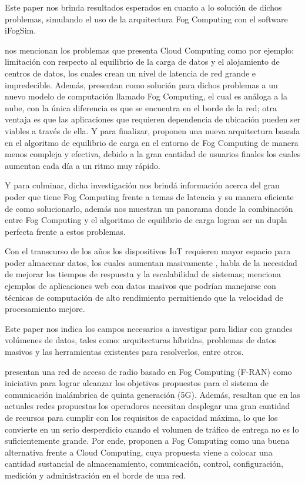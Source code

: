        Este paper nos brinda resultados esperados en cuanto a lo solución de dichos problemas, simulando el uso de la arquitectura Fog Computing con el software iFogSim.\par
        \vskip 0.3cm
        {\bf\cite{verma2015}} nos mencionan los problemas que presenta Cloud Computing como por ejemplo: limitación con respecto al equilibrio de la carga de datos y el alojamiento de centros de datos, los cuales crean un nivel de latencia de red grande e impredecible. Además, presentan como solución para dichos problemas a un nuevo modelo de computación llamado Fog Computing, el cual es análoga a la nube, con la única diferencia es que se encuentra en el borde de la red; otra ventaja es que las aplicaciones que requieren dependencia de ubicación pueden ser viables a través de ella. Y para finalizar, proponen una nueva arquitectura basada en el algoritmo de equilibrio de carga en el entorno de Fog Computing de manera menos compleja y efectiva, debido a la gran cantidad de usuarios finales los cuales aumentan cada día a un ritmo muy rápido. \par
        Y para culminar, dicha investigación nos brindá información acerca del gran poder que tiene Fog Computing frente a temas de latencia y su manera eficiente de como solucionarlo, además nos muestran un panorama donde la combinación entre Fog Computing y el algoritmo de equilibrio de carga logran ser un dupla perfecta frente a estos problemas.\par
        \vskip 0.3cm
        Con el transcurso de los años los dispositivos IoT requieren mayor espacio para poder almacenar datos, los cuales aumentan masivamente {\bf\citep{murazzo2017}}, habla de la necesidad de mejorar los tiempos de respuesta y la escalabilidad de sistemas; menciona ejemplos de aplicaciones web con datos masivos que podrían manejarse con técnicas de computación de alto rendimiento permitiendo que la velocidad de procesamiento mejore.\par
        Este paper nos indica los campos necesarios a investigar para lidiar con grandes volúmenes de datos, tales como: arquitecturas híbridas, problemas de datos masivos y las herramientas existentes para resolverlos, entre otros.\par
        \vskip 0.3cm
        {\bf\cite{mugen2015}} presentan una red de acceso de radio basado en Fog Computing (F-RAN) como iniciativa para lograr alcanzar los objetivos propuestos para el sistema de comunicación inalámbrica de quinta generación (5G). Además, resaltan que en las actuales redes propuestas los operadores necesitan desplegar una gran cantidad de recursos para cumplir con los requisitos de capacidad máxima, lo que los convierte en un serio desperdicio cuando el volumen de tráfico de entrega no es lo suficientemente grande. Por ende, proponen a Fog Computing como una buena alternativa frente a Cloud Computing, cuya propuesta viene a colocar una cantidad sustancial de almacenamiento, comunicación, control, configuración, medición y administración en el borde de una red.\par
